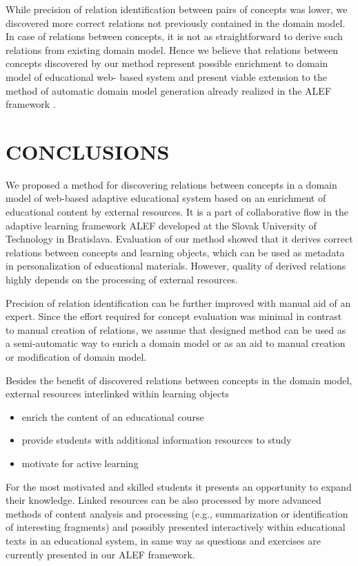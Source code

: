 \documentclass[a4, conference]{IEEEtran}
\begin{document}
While precision of relation identification between pairs of concepts was lower, we discovered more correct relations not previously contained in the domain model. In case of relations between concepts, it is not as straightforward to derive such relations from existing domain model. Hence we believe that relations between concepts discovered by our method represent possible enrichment to domain model of educational web- based system and present viable extension to the method of automatic domain model generation already realized in the ALEF framework \cite{ref:vsimko2009automated }. 
\section{CONCLUSIONS}
%  
We proposed a method for discovering relations between concepts in a domain model of web-based adaptive educational system based on an enrichment of educational content by external resources. It is a part of collaborative flow in the adaptive learning framework ALEF developed at the Slovak University of Technology in Bratislava. Evaluation of our method showed that it derives correct relations between concepts and learning objects, which can be used as metadata in personalization of educational materials. However, quality of derived relations highly depends on the processing of external resources.

Precision of relation identification can be further improved with manual aid of an expert. Since the effort required for concept evaluation was minimal in contrast to manual creation of relations, we assume that designed method can be used as a semi-automatic way to enrich a domain model or as an aid to manual creation or modification of domain model.

Besides the benefit of discovered relations between concepts in the domain model, external resources interlinked within learning objects  
\begin{itemize}
\item enrich the content of an educational course
\item provide students with additional information resources to study 
\item motivate for active learning
\end{itemize} 
For the most motivated and skilled students it presents an opportunity to expand their knowledge. Linked resources can be also processed by more advanced methods of content analysis and processing (e.g., summarization or identification of interesting fragments) and possibly presented interactively within educational texts in an educational system, in same way as questions and exercises are currently presented in our ALEF framework.
\end{document}
